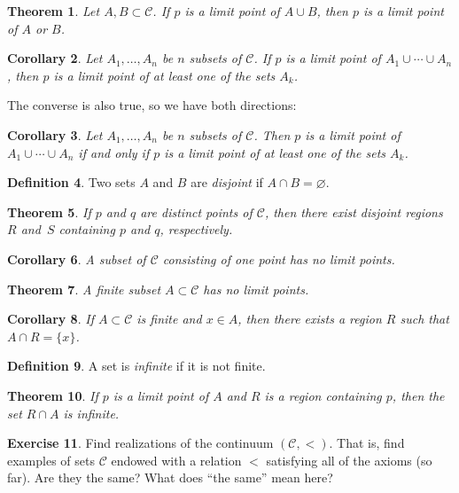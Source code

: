 \documentclass[12pt]{article}
\newcommand{\calC}{\mathcal{C}}
\renewcommand{\_}[1]{\underline{ #1 }}
\newtheorem{theorem}{\color{navy}Theorem}[section]
\newtheorem{corollary}[theorem]{\color{pink}Corollary}
\theoremstyle{definition}
\newtheorem{definition}[theorem]{\color{forrest}Definition}
\newtheorem{exercise}[theorem]{\color{orange}Exercise}
\numberwithin{equation}{subsection}
\begin{document}
\begin{theorem}  Let $A, B \subset \calC$.  If $p$ is a limit point of $A \cup B$, then $p$ is a limit point of $A$ or $B$.
\end{theorem}

\begin{corollary}  Let $A_1, \dotsc, A_n$ be $n$ subsets of $\calC$.  If $p$ is a limit point of $A_1 \cup \dotsm \cup A_n$, then $p$ is a limit point of at least one of the sets $A_k$.
\end{corollary}

The converse is also true, so we have both directions:

\begin{corollary}
Let $A_1, \dotsc, A_n$ be $n$ subsets of $\calC$.  Then $p$ is a limit point of $A_1 \cup \dotsm \cup A_n$ if and only if $p$ is a limit point of at least one of the sets $A_k$.
\end{corollary}

\begin{definition}  Two sets $A$ and $B$ are \emph{disjoint} if $A \cap B = \varnothing$.  
\end{definition}

\begin{theorem}  If $p$ and $q$ are distinct points of $\calC$, then there exist disjoint regions $R$ and~$S$ containing $p$ and $q$, respectively.
\end{theorem}

\begin{corollary}  A subset of $\calC$ consisting of one point has no limit points.
\end{corollary}

\begin{theorem} A finite subset $A \subset \calC$ has no limit points.
\end{theorem}

\begin{corollary}  If $A \subset \calC$ is finite and $x \in A$, then there exists a region $R$ such that $A \cap R = \{ x \}$.
\end{corollary}

\begin{definition}  A set is \emph{infinite} if it is not finite.
\end{definition}

\begin{theorem}  If $p$ is a limit point of $A$ and $R$ is a region containing $p$, then the set $R \cap A$ is infinite.
\end{theorem}

\begin{exercise}  Find realizations of the continuum $\left(\calC, <\right)$.  That is, find examples of sets $\calC$ endowed with a relation $<$ satisfying all of the axioms (so far).  Are they the same?  What does ``the same'' mean here?
\end{exercise}
\end{document}
